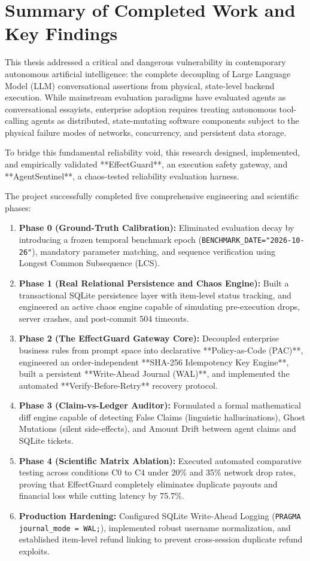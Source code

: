 \section{Summary of Completed Work and Key Findings}
\label{sec:concl_summary}
This thesis addressed a critical and dangerous vulnerability in contemporary autonomous artificial intelligence: the complete decoupling of Large Language Model (LLM) conversational assertions from physical, state-level backend execution. While mainstream evaluation paradigms have evaluated agents as conversational essayists, enterprise adoption requires treating autonomous tool-calling agents as distributed, state-mutating software components subject to the physical failure modes of networks, concurrency, and persistent data storage.

To bridge this fundamental reliability void, this research designed, implemented, and empirically validated **EffectGuard**, an execution safety gateway, and **AgentSentinel**, a chaos-tested reliability evaluation harness. 

The project successfully completed five comprehensive engineering and scientific phases:
\begin{enumerate}
    \item \textbf{Phase 0 (Ground-Truth Calibration):} Eliminated evaluation decay by introducing a frozen temporal benchmark epoch (\texttt{BENCHMARK\_DATE="2026-10-26"}), mandatory parameter matching, and sequence verification using Longest Common Subsequence (LCS).
    \item \textbf{Phase 1 (Real Relational Persistence and Chaos Engine):} Built a transactional SQLite persistence layer with item-level status tracking, and engineered an active chaos engine capable of simulating pre-execution drops, server crashes, and post-commit 504 timeouts.
    \item \textbf{Phase 2 (The EffectGuard Gateway Core):} Decoupled enterprise business rules from prompt space into declarative **Policy-as-Code (PAC)**, engineered an order-independent **SHA-256 Idempotency Key Engine**, built a persistent **Write-Ahead Journal (WAL)**, and implemented the automated **Verify-Before-Retry** recovery protocol.
    \item \textbf{Phase 3 (Claim-vs-Ledger Auditor):} Formulated a formal mathematical diff engine capable of detecting False Claims (linguistic hallucinations), Ghost Mutations (silent side-effects), and Amount Drift between agent claims and SQLite tickets.
    \item \textbf{Phase 4 (Scientific Matrix Ablation):} Executed automated comparative testing across conditions C0 to C4 under 20\% and 35\% network drop rates, proving that EffectGuard completely eliminates duplicate payouts and financial loss while cutting latency by 75.7\%.
    \item \textbf{Production Hardening:} Configured SQLite Write-Ahead Logging (\texttt{PRAGMA journal\_mode = WAL;}), implemented robust username normalization, and established item-level refund linking to prevent cross-session duplicate refund exploits.
\end{enumerate}

